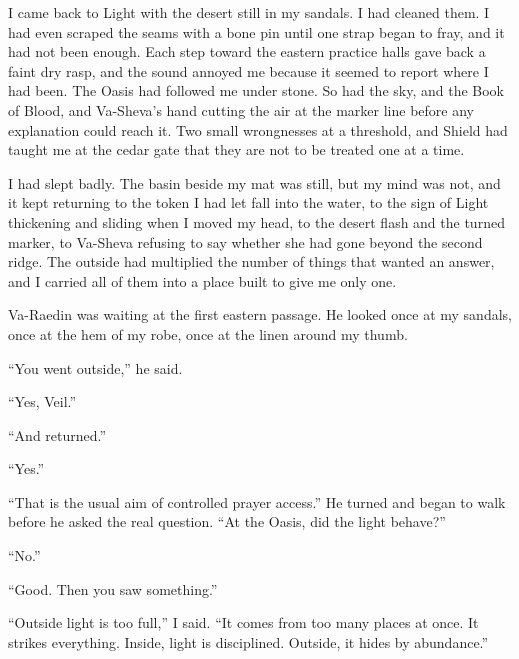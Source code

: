\ornament

I came back to Light with the desert still in my sandals. I had cleaned them. I had even scraped the seams with a bone pin until one strap began to fray, and it had not been enough. Each step toward the eastern practice halls gave back a faint dry rasp, and the sound annoyed me because it seemed to report where I had been. The Oasis had followed me under stone. So had the sky, and the Book of Blood, and Va-Sheva's hand cutting the air at the marker line before any explanation could reach it. Two small wrongnesses at a threshold, and Shield had taught me at the cedar gate that they are not to be treated one at a time.\par

I had slept badly. The basin beside my mat was still, but my mind was not, and it kept returning to the token I had let fall into the water, to the sign of Light thickening and sliding when I moved my head, to the desert flash and the turned marker, to Va-Sheva refusing to say whether she had gone beyond the second ridge. The outside had multiplied the number of things that wanted an answer, and I carried all of them into a place built to give me only one.\par

Va-Raedin was waiting at the first eastern passage. He looked once at my sandals, once at the hem of my robe, once at the linen around my thumb.\par

``You went outside,'' he said.\par

``Yes, Veil.''\par

``And returned.''\par

``Yes.''\par

``That is the usual aim of controlled prayer access.'' He turned and began to walk before he asked the real question. ``At the Oasis, did the light behave?''\par

``No.''\par

``Good. Then you saw something.''\par

``Outside light is too full,'' I said. ``It comes from too many places at once. It strikes everything. Inside, light is disciplined. Outside, it hides by abundance.''\par

